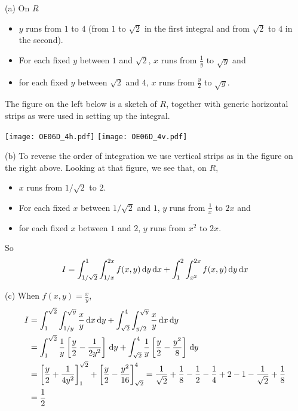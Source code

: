 \begin{solution}
(a) On $R$
\begin{itemize}
\item
$y$ runs from $1$ to $4$ (from $1$ to $\sqrt{2}$ in the first integral and
from $\sqrt{2}$ to $4$ in the second).
\item 
For each fixed $y$ between $1$ and $\sqrt{2}$, $x$ runs from $\frac{1}{y}$
to $\sqrt{y}$ and 
\item 
for each fixed $y$ between $\sqrt{2}$ and $4$, $x$ runs from $\frac{y}{2}$
to $\sqrt{y}$.
\end{itemize}
The figure on the left below is a sketch of $R$, together with 
generic horizontal strips as were used in setting up the integral.

\begin{center}
     \texttt{[image: OE06D\_4h.pdf]}\qquad
     \texttt{[image: OE06D\_4v.pdf]}
\end{center}

(b) To reverse the order of integration we use vertical strips as in
the figure on the right above. Looking at that figure, we see that, on $R$,
\begin{itemize}
\item
$x$ runs from $1/\sqrt{2}$ to $2$.
\item 
For each fixed $x$ between $1/\sqrt{2}$ and $1$, $y$ runs from $\frac{1}{x}$
to $2x$ and 
\item 
for each fixed $x$ between $1$ and $2$, $y$ runs from $x^2$
to $2x$.
\end{itemize}
So
\begin{align*}
I= \int_{1/\sqrt{2}}^1 \int_{1/x}^{2x} f(x,y)\,\mathrm{d}y\,\mathrm{d}x
    +\int_1^2 \int_{x^2}^{2x} f(x,y)\,\mathrm{d}y\,\mathrm{d}x
\end{align*}

(c) When $f(x,y)=\frac{x}{y}$,
\begin{align*}
I &= \int_1^{\sqrt{2}} \int_{1/y}^{\sqrt{y}} \frac{x}{y}\,\mathrm{d}x\,\mathrm{d}y
    +\int_{\sqrt{2}}^4 \int_{y/2}^{\sqrt{y}} \frac{x}{y}\,\mathrm{d}x\,\mathrm{d}y \\
  &=\int_1^{\sqrt{2}} \frac{1}{y}\left[\frac{y}{2}-\frac{1}{2y^2}\right]
                                               \,\mathrm{d}y
    +\int_{\sqrt{2}}^4 \frac{1}{y}\left[\frac{y}{2}-\frac{y^2}{8}\right]
                                               \,\mathrm{d}y \\
  &=\left[\frac{y}{2}+\frac{1}{4y^2}\right]_1^{\sqrt{2}}
    +\left[\frac{y}{2}-\frac{y^2}{16}\right]_{\sqrt{2}}^4 
   =\frac{1}{\sqrt{2}} +\frac{1}{8}-\frac{1}{2}-\frac{1}{4}
     +2 -1 -\frac{1}{\sqrt{2}} +\frac{1}{8} \\
  &=\frac{1}{2}
\end{align*}
\end{solution}


